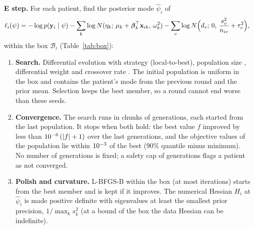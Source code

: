 \documentclass[11pt]{article}
\begin{document}
\textbf{E step.} For each patient, find the posterior mode $\hat\psi_i$ of
\begin{equation}
\ell_i(\psi) = -\log p(\mathbf y_i\mid\psi)-\sum_k\log N(\eta_{k};\,\mu_k+\boldsymbol\beta_k^\top\mathbf x_{ik},\,\omega_k^2)-\sum_v\log N\Bigl(d_{v};\,0,\,\frac{s_v^2}{n_{iv}}+\tau_v^2\Bigr), \label{eq:nlp}
\end{equation}
within the box $\mathcal B_i$ (Table~\ref{tab:box}):
\begin{enumerate}
\item \textbf{Search.} Differential evolution with strategy \valDeStrategy{} (local-to-best), population size \valDeNp, differential weight \valDeF{} and crossover rate \valDeCR. The initial population is uniform in the box and contains the patient's mode from the previous round and the prior mean. Selection keeps the best member, so a round cannot end worse than these seeds.
\item \textbf{Convergence.} The search runs in chunks of \valDeChunk{} generations, each started from the last population. It stops when both hold: the best value $f$ improved by less than $10^{-6}\,(|f|+1)$ over the last \valDeWindow{} generations, and the objective values of the population lie within $10^{-3}$ of the best (90\% quantile minus minimum). No number of generations is fixed; a safety cap of \valDeMaxGen{} generations flags a patient as not converged.
\item \textbf{Polish and curvature.} L-BFGS-B within the box (at most \valDePolish{} iterations) starts from the best member and is kept if it improves. The numerical Hessian $H_i$ at $\hat\psi_i$ is made positive definite with eigenvalues at least the smallest prior precision, $1/\max_k s_k^2$ (at a bound of the box the data Hessian can be indefinite).
\end{enumerate}
\end{document}
